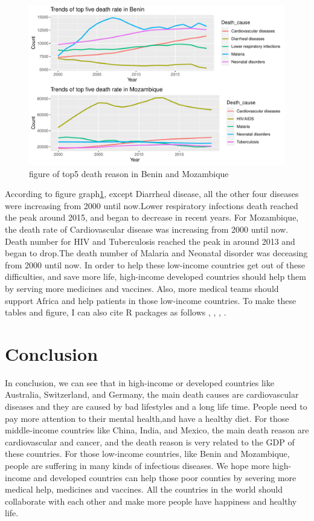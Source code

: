 \documentclass[11pt,a4paper,]{article}
\begin{document}
\begin{figure}
\centering
\includegraphics{Assignment4_files/figure-latex/topfiveplot-1.pdf}
\caption{\label{fig:topfiveplot}figure of top5 death reason in Benin and Mozambique}
\end{figure}

According to figure graph\ref{fig:topfiveplot}, except Diarrheal disease, all the other four diseases were increasing from 2000 until now.Lower respiratory infections death reached the peak around 2015, and began to decrease in recent years. For Mozambique, the death rate of Cardiovascular disease was increasing from 2000 until now. Death number for HIV and Tuberculosis reached the peak in around 2013 and began to drop.The death number of Malaria and Neonatal disorder was deceasing from 2000 until now. In order to help these low-income countries get out of these difficulties, and save more life, high-income developed countries should help them by serving more medicines and vaccines. Also, more medical teams should support Africa and help patients in those low-income countries. To make these tables and figure, I can also cite R packages as follows \textcite{tidyverse}, \textcite{ggplot2}, \textcite{readr}, \textcite{gridExtra}.

\clearpage

\hypertarget{conclusion}{%
\section{Conclusion}\label{conclusion}}

In conclusion, we can see that in high-income or developed countries like Australia, Switzerland, and Germany, the main death causes are cardiovascular diseases and they are caused by bad lifestyles and a long life time. People need to pay more attention to their mental health,and have a healthy diet. For those middle-income countries like China, India, and Mexico, the main death reason are cardiovascular and cancer, and the death reason is very related to the GDP of these countries. For those low-income countries, like Benin and Mozambique, people are suffering in many kinds of infectious diseases. We hope more high-income and developed countries can help those poor counties by severing more medical help, medicines and vaccines. All the countries in the world should collaborate with each other and make more people have happiness and healthy life.

\printbibliography
\end{document}
